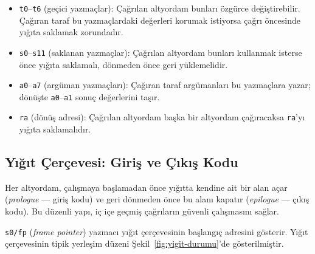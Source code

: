\begin{itemize}[nosep]
\item \texttt{t0}--\texttt{t6} (geçici yazmaçlar): Çağrılan altyordam bunları özgürce değiştirebilir. Çağıran taraf bu yazmaçlardaki değerleri korumak istiyorsa çağrı öncesinde yığıta saklamak zorundadır.
\item \texttt{s0}--\texttt{s11} (saklanan yazmaçlar): Çağrılan altyordam bunları kullanmak isterse önce yığıta saklamalı, dönmeden önce geri yüklemelidir.
\item \texttt{a0}--\texttt{a7} (argüman yazmaçları): Çağıran taraf argümanları bu yazmaçlara yazar; dönüşte \texttt{a0}--\texttt{a1} sonuç değerlerini taşır.
\item \texttt{ra} (dönüş adresi): Çağrılan altyordam başka bir altyordam çağıracaksa \texttt{ra}'yı yığıta saklamalıdır.
\end{itemize}

\subsection{Yığıt Çerçevesi: Giriş ve Çıkış Kodu}
\label{sec:yigit-cercevesi}

Her altyordam, çalışmaya başlamadan önce yığıtta kendine ait bir alan açar (\emph{prologue} --- giriş kodu) ve geri dönmeden önce bu alanı kapatır (\emph{epilogue} --- çıkış kodu). Bu düzenli yapı, iç içe geçmiş çağrıların güvenli çalışmasını sağlar.

\texttt{s0/fp} (\emph{frame pointer}) yazmacı yığıt çerçevesinin başlangıç adresini gösterir. Yığıt çerçevesinin tipik yerleşim düzeni Şekil~\ref{fig:yigit-durumu}'de gösterilmiştir.

